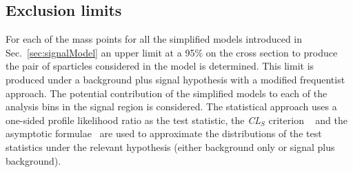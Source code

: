 
\subsection{Exclusion limits}

For each of the mass points for all the simplified models introduced
in Sec.~\ref{sec:signalModel} an upper limit at a 95\% \CL on the
cross section to produce the pair of sparticles considered in the
model is determined. This limit is produced under a background plus
signal hypothesis with a modified frequentist approach. The potential
contribution of the simplified models to each of the analysis bins in
the signal region is considered. The statistical approach uses a
one-sided profile likelihood ratio as the test statistic, the
\emph{CL$_S$} criterion ~\cite{junk, read} and the asymptotic
formulae~\cite{Cowan:2010js} are used to approximate the distributions
of the test statistics under the relevant hypothesis (either
background only or signal plus background). 

